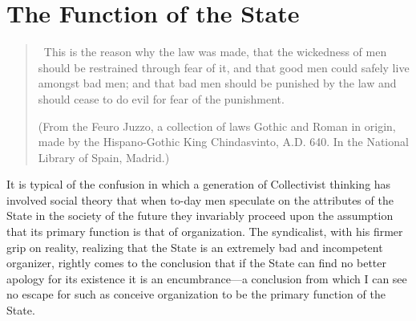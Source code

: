 \documentclass{book}
\begin{document}
\chapter{The Function of the State}
\label{chapter-5}
\begin{quotation}\
	This is the reason why the law was made, that the wickedness of men should be restrained through fear of it, and that good men could safely live amongst bad men; and that bad men should be punished by the law and should cease to do evil for fear of the punishment.

	(From the Feuro Juzzo, a collection of laws Gothic and Roman in origin, made by the Hispano-Gothic King Chindasvinto, A.D. 640. In the National Library of Spain, Madrid.)
\end{quotation}

It is typical of the confusion in which a generation of Collectivist thinking has involved social theory that when to-day men speculate on the attributes of the State in the society of the future they invariably proceed upon the assumption that its primary function is that of organization. The syndicalist, with his firmer grip on reality, realizing that the State is an extremely bad and incompetent organizer, rightly comes to the conclusion that if the State can find no better apology for its existence it is an encumbrance—a conclusion from which I can see no escape for such as conceive organization to be the primary function of the State.
\end{document}
